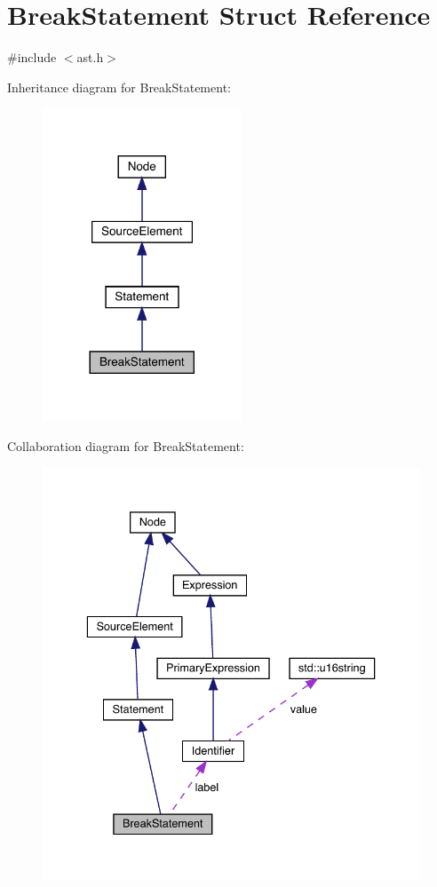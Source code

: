 \hypertarget{struct_break_statement}{}\section{Break\+Statement Struct Reference}
\label{struct_break_statement}


{\ttfamily \#include $<$ast.\+h$>$}



Inheritance diagram for Break\+Statement\+:\nopagebreak
\begin{figure}[H]
\begin{center}
\leavevmode
\includegraphics[width=168pt]{struct_break_statement__inherit__graph}
\end{center}
\end{figure}


Collaboration diagram for Break\+Statement\+:\nopagebreak
\begin{figure}[H]
\begin{center}
\leavevmode
\includegraphics[width=336pt]{struct_break_statement__coll__graph}
\end{center}
\end{figure}
